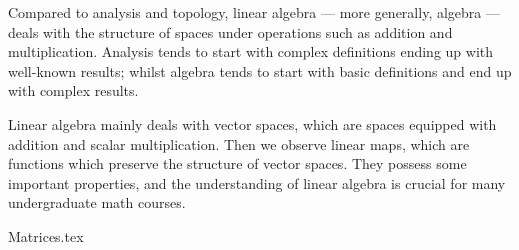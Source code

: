 \label{chap:linalg}

Compared to analysis and topology,
linear algebra --- more generally, algebra ---
deals with the structure of spaces
under operations such as addition and multiplication.
Analysis tends to
start with complex definitions ending up with well-known results;
whilst algebra tends to
start with basic definitions and end up with complex results.

Linear algebra mainly deals with vector spaces,
which are spaces equipped with addition and scalar multiplication.
Then we observe linear maps,
which are functions which preserve the structure of vector spaces.
They possess some important properties,
and the understanding of linear algebra is crucial
for many undergraduate math courses.

{Matrices.tex}
